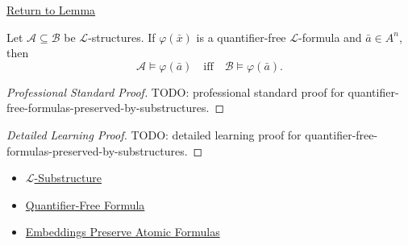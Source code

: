 \newpage
{}
\label{prf:quantifier-free-formulas-preserved-by-substructures}

\begin{remark*}[Return]
\hyperref[lem:quantifier-free-formulas-preserved-by-substructures]{Return to Lemma}
\end{remark*}

\begin{lemma*}
Let $\mathcal{A}\subseteq\mathcal{B}$ be $\mathcal{L}$-structures. If
$\varphi(\bar x)$ is a quantifier-free $\mathcal{L}$-formula and
$\bar a\in A^n$, then
\[
  \mathcal{A}\models\varphi(\bar a)
  \quad\text{iff}\quad
  \mathcal{B}\models\varphi(\bar a).
\]
\end{lemma*}

\begin{proof}[Professional Standard Proof]
\LRAProofBodyStart
TODO: professional standard proof for quantifier-free-formulas-preserved-by-substructures.
\end{proof}

\begin{proof}[Detailed Learning Proof]
\LRAProofBodyStart
TODO: detailed learning proof for quantifier-free-formulas-preserved-by-substructures.
\end{proof}

\begin{remark*}
\end{remark*}

\begin{dependencies}
\begin{itemize}
  \item \hyperref[def:l-substructure]{$\mathcal{L}$-Substructure}
  \item \hyperref[def:quantifier-free-formula]{Quantifier-Free Formula}
  \item \hyperref[lem:embeddings-preserve-atomic-formulas]{Embeddings Preserve Atomic Formulas}
\end{itemize}
\end{dependencies}

\clearpage

